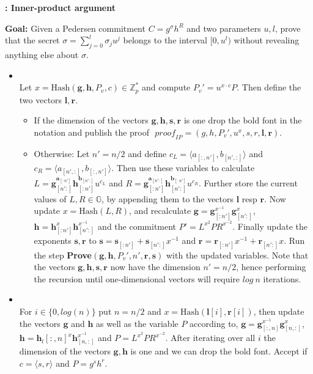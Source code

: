 \begin{algorithm}[H]
\caption{\textbf{: Inner-product argument}}
\textbf{Goal:} Given a Pedersen commitment $C=g^\sigma h^R$ and two parameters $u,l$, prove that the secret $\sigma=\sum_{j=0}^l \sigma_ju^j$ belongs to the interval $[0,u^l)$ without revealing anything else about $\sigma$.
\vspace{2pt}
\hline
\vspace{2pt}
\begin{itemize}
\item{}\\
Let $x=\text{Hash}(\mathbf{g},\mathbf{h},P_v,c) \in\mathds{Z}_p^*$ and compute $P_v'= u^{x\cdot c}P$. Then define the two vectors $\mathbf{l},\mathbf{r}$.
\begin{itemize}
    \item If the dimension of the vectors $\mathbf{g},\mathbf{h},\mathbf{s},\mathbf{r}$ is one drop the bold font in the notation and publish the proof $\textit{ proof}_{IP}=(g,h,P_v',u^x,s,r,\mathbf{l},\mathbf{r})$.
    \item  Otherwise:  Let $n'=n/2$ and define  $c_L=\langle a_{[:,n']},b_{[n',:]} \rangle$ and $c_R=\langle a_{[n',:]},b_{[:,n']} \rangle$. Then use these variables to calculate $L=\mathbf{g}_{[n':]}^{\mathbf{a}_{[:n']}} \mathbf{h}_{[:n']}^{\mathbf{b}_{[n':]}} u^{c_L}$ and $R=\mathbf{g}_{[:n']}^{\mathbf{a}_{[n':]}} \mathbf{h}_{[n':]}^{\mathbf{b}_{[:n']}} u^{c_R}$. Further store the current values of $L,R\in\mathds{G}$, by appending them to the vectors $\mathbf{l}$ resp $\mathbf{r}$. Now update $x=\text{Hash}(L,R)$, and recalculate $\mathbf{g} = \mathbf{g}_{[:n']}^{x^{-1}}\mathbf{g}_{[n':]}^{x}$, $\mathbf{h} = \mathbf{h}_{[:n']}^{x}\mathbf{h}_{[n':]}^{x^{-1}}$ and the commitment $P'=L^{x^2}PR^{x^{-2}}$. Finally update the exponents $\mathbf{s},\mathbf{r}$ to $\mathbf{s} = \mathbf{s}_{[:n']}+\mathbf{s}_{[n':]}x^{-1}$ and $\mathbf{r} = \mathbf{r}_{[:n']}x^{-1}+\mathbf{r}_{[n':]}x$. Run the step \textbf{Prove}$(\mathbf{g},\mathbf{h},P_v',n',\mathbf{r},\mathbf{s})$ with the updated variables. Note that the vectors $\mathbf{g},\mathbf{h},\mathbf{s},\mathbf{r}$ now have the dimension $n'=n/2$, hence performing the recursion until one-dimensional vectors will require $log\:n$ iterations.
\end{itemize}
\item{}\\
For $i\in\{0,log(n)\}$ put $n=n/2$ and $x=\text{Hash}(\bm{l}[i],\bm{r}[i])$, then update the vectors $\bm{g}$ and $\bm{h}$ as well as the  variable $P$ according to, $\bm{g}= \bm{g}_{[:,n]}^{x^{-1}}\bm{g}_{[n,:]}^{x}$, $\bm{h}= \bm{h}_l{[:,n]}^{x}\bm{h}_{[n,:]}^{x^{-1}}$ and $ P = L^{x^2}PR^{x^{-2}}  $. After iterating over all $i$ the dimension of the vectors $\bm{g},\bm{h}$ is one and we can drop the bold font. Accept if $c=\langle s,r\rangle$ and $P =g^sh^r$.


\end{itemize}
\end{algorithm}
